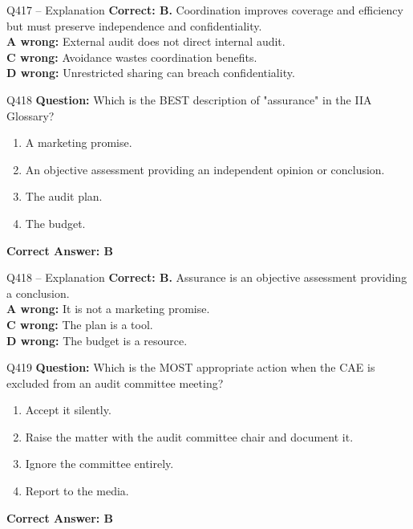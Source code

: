 \documentclass[aspectratio=169,10pt]{beamer}
\begin{document}
	\begin{frame}[t]{Q417 -- Explanation}
		\small
		\textbf{Correct: B.} Coordination improves coverage and efficiency but must preserve independence and confidentiality. \\[4pt]
		\textbf{A wrong:} External audit does not direct internal audit. \\[2pt]
		\textbf{C wrong:} Avoidance wastes coordination benefits. \\[2pt]
		\textbf{D wrong:} Unrestricted sharing can breach confidentiality.
	\end{frame}
	
	\begin{frame}[t]{Q418}
		\small
		\textbf{Question:} Which is the BEST description of "assurance" in the IIA Glossary?
		\begin{enumerate}[label=\Alph*.,itemsep=1pt,topsep=2pt]
			\item A marketing promise.
			\item An objective assessment providing an independent opinion or conclusion.
			\item The audit plan.
			\item The budget.
		\end{enumerate}
		\vspace{4pt}
		\textbf{Correct Answer: B}
	\end{frame}
	
	\begin{frame}[t]{Q418 -- Explanation}
		\small
		\textbf{Correct: B.} Assurance is an objective assessment providing a conclusion. \\[4pt]
		\textbf{A wrong:} It is not a marketing promise. \\[2pt]
		\textbf{C wrong:} The plan is a tool. \\[2pt]
		\textbf{D wrong:} The budget is a resource.
	\end{frame}
	
	\begin{frame}[t]{Q419}
		\small
		\textbf{Question:} Which is the MOST appropriate action when the CAE is excluded from an audit committee meeting?
		\begin{enumerate}[label=\Alph*.,itemsep=1pt,topsep=2pt]
			\item Accept it silently.
			\item Raise the matter with the audit committee chair and document it.
			\item Ignore the committee entirely.
			\item Report to the media.
		\end{enumerate}
		\vspace{4pt}
		\textbf{Correct Answer: B}
	\end{frame}
	
\end{document}
